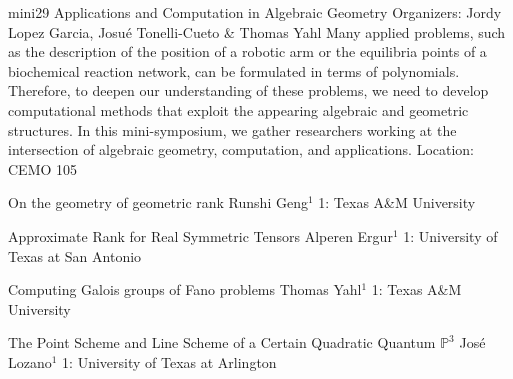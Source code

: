 \mini
{mini29}
{Applications and Computation in Algebraic Geometry}
{Organizers: Jordy Lopez Garcia, Josu\'e Tonelli-Cueto \& Thomas Yahl}
{Many applied problems, such as the description of the position of a robotic arm or the equilibria points of a biochemical reaction network, can be formulated in terms of polynomials. Therefore, to deepen our understanding of these problems, we need to develop computational methods that exploit the appearing algebraic and geometric structures. In this mini-symposium, we gather researchers working at the intersection of algebraic geometry, computation, and applications.}
{Location: CEMO 105}

\begin{talks}
\item\talk
{On the geometry of geometric rank}
{Runshi Geng$^{1}$}
{1: Texas A\&M University}
\item\talk
{Approximate Rank for Real Symmetric Tensors}
{Alperen Ergur$^{1}$}
{1: University of Texas at San Antonio}
\item\talk
{Computing Galois groups of Fano problems}
{Thomas Yahl$^{1}$}
{1: Texas A\&M University}
\item\talk
{The Point Scheme and Line Scheme of a Certain Quadratic Quantum $\mathbb{P}^3$}%
{Jos\'{e} Lozano$^{1}$}
{1: University of Texas at Arlington}
\end{talks}
\room
